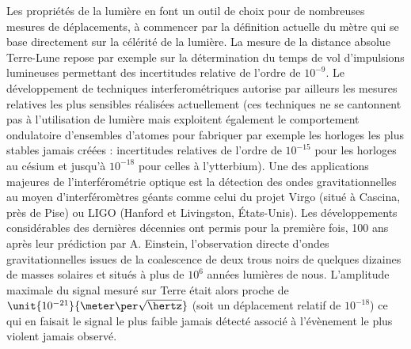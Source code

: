 \documentclass[12pt,a4paper]{article}
\begin{document}
Les propriétés de la lumière en font un outil de choix pour de nombreuses mesures de déplacements, à commencer par la définition actuelle du mètre qui se base directement sur la célérité de la lumière.
La mesure de la distance absolue Terre-Lune repose par exemple sur la détermination du temps de vol d'impulsions lumineuses permettant des incertitudes relative de l'ordre de $10^{-9}$.
Le développement de techniques interferométriques autorise par ailleurs les mesures relatives les plus sensibles réalisées actuellement (ces techniques ne se cantonnent pas à l'utilisation de lumière mais exploitent également le comportement ondulatoire d'ensembles d'atomes pour fabriquer par exemple les horloges les plus stables jamais créées : incertitudes relatives de l'ordre de $10^{-15}$ pour les horloges au césium et jusqu'à $10^{-18}$ pour celles à l'ytterbium).
Une des applications majeures de l'interférométrie optique est la détection des ondes gravitationnelles au moyen d'interféromètres géants comme celui du projet Virgo (situé à Cascina, près de Pise) ou LIGO (Hanford et Livingston, États-Unis).
Les développements considérables des dernières décennies ont permis pour la première fois, 100 ans après leur prédiction par A. Einstein, l'observation directe d'ondes gravitationnelles issues de la coalescence de deux trous noirs de quelques dizaines de masses solaires et situés à plus de $10^6$ années lumières de nous.
L'amplitude maximale du signal mesuré sur Terre était alors proche de $\unit{10^{-21}}{\meter\per\sqrt{\hertz}}$ (soit un déplacement relatif de $10^{-18}$) ce qui en faisait le signal le plus faible jamais détecté associé à l'évènement le plus violent jamais observé.
\end{document}
